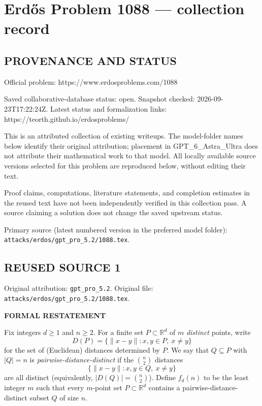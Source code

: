 \section*{Erd\H{o}s Problem 1088 --- collection record}

\subsection*{PROVENANCE AND STATUS}
Official problem: https://www.erdosproblems.com/1088

Saved collaborative-database status: open.
Snapshot checked: 2026-09-23T17:22:24Z.
Latest status and formalization links: https://teorth.github.io/erdosproblems/

This is an attributed collection of existing writeups. The model-folder names below identify their original attribution; placement in GPT\_6\_Astra\_Ultra does not attribute their mathematical work to that model. All locally available source versions selected for this problem are reproduced below, without editing their text.

Proof claims, computations, literature statements, and completion estimates in the reused text have not been independently verified in this collection pass. A source claiming a solution does not change the saved upstream status.

Primary source (latest numbered version in the preferred model folder): \texttt{attacks/erdos/gpt\_pro\_5.2/1088.tex}.

\subsection*{REUSED SOURCE 1}
Original attribution: \texttt{gpt\_pro\_5.2}.
Original file: \texttt{attacks/erdos/gpt\_pro\_5.2/1088.tex}.


\textbf{FORMAL RESTATEMENT}

Fix integers $d\ge 1$ and $n\ge 2$. For a finite set $P\subset \mathbb{R}^d$ of $m$ \emph{distinct} points, write
\[D(P)=\{\|x-y\| : x,y\in P,\ x\neq y\}\]
for the set of (Euclidean) distances determined by $P$.
We say that $Q\subseteq P$ with $|Q|=n$ is \emph{pairwise-distance-distinct} if the $\binom{n}{2}$ distances
\[\{\|x-y\|: x,y\in Q,\ x\neq y\}
\]
are all distinct (equivalently, $|D(Q)|=\binom{n}{2}$).
Define $f_d(n)$ to be the least integer $m$ such that every $m$-point set $P\subset \mathbb{R}^d$ contains a pairwise-distance-distinct subset $Q$ of size $n$.

